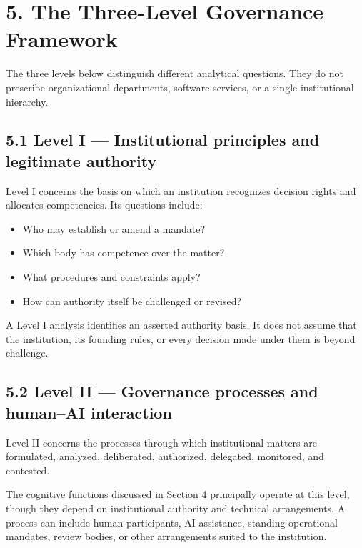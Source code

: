 \documentclass[
  10pt,
]{article}
\providecommand{\tightlist}{%
  \setlength{\itemsep}{0pt}\setlength{\parskip}{0pt}}
\begin{document}
\section{5. The Three-Level Governance
Framework}\label{the-three-level-governance-framework}

The three levels below distinguish different analytical questions. They
do not prescribe organizational departments, software services, or a
single institutional hierarchy.

\subsection{5.1 Level I --- Institutional principles and legitimate
authority}\label{level-i-institutional-principles-and-legitimate-authority}

Level I concerns the basis on which an institution recognizes decision
rights and allocates competencies. Its questions include:

\begin{itemize}
\tightlist
\item
  Who may establish or amend a mandate?
\item
  Which body has competence over the matter?
\item
  What procedures and constraints apply?
\item
  How can authority itself be challenged or revised?
\end{itemize}

A Level I analysis identifies an asserted authority basis. It does not
assume that the institution, its founding rules, or every decision made
under them is beyond challenge.

\subsection{5.2 Level II --- Governance processes and human--AI
interaction}\label{level-ii-governance-processes-and-humanai-interaction}

Level II concerns the processes through which institutional matters are
formulated, analyzed, deliberated, authorized, delegated, monitored, and
contested.

The cognitive functions discussed in Section 4 principally operate at
this level, though they depend on institutional authority and technical
arrangements. A process can include human participants, AI assistance,
standing operational mandates, review bodies, or other arrangements
suited to the institution.
\end{document}
